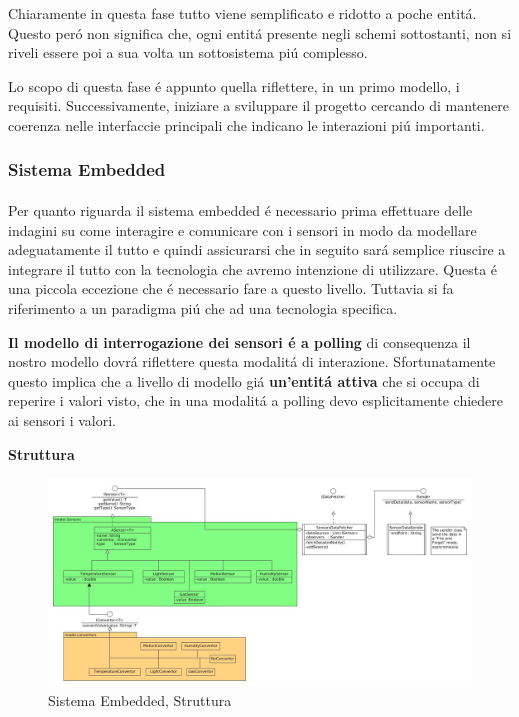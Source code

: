 Chiaramente in questa fase tutto viene semplificato e ridotto a poche entit\'a. Questo per\'o non significa che, ogni entit\'a presente negli schemi sottostanti, non si riveli essere poi a sua volta un sottosistema pi\'u complesso.

Lo scopo di questa fase \'e appunto quella riflettere, in un primo modello, i requisiti. Successivamente, iniziare a sviluppare il progetto cercando di mantenere coerenza nelle interfaccie principali che indicano le interazioni pi\'u importanti.

\newpage

\subsubsection{Sistema Embedded}

\paragraph{}Per quanto riguarda il sistema embedded \'e necessario prima effettuare delle indagini su come interagire e comunicare con i sensori in modo da modellare adeguatamente il tutto e quindi assicurarsi che in seguito sar\'a semplice riuscire a integrare il tutto con la tecnologia che avremo intenzione di utilizzare. Questa \'e una piccola eccezione che \'e necessario fare a questo livello. Tuttavia si fa riferimento a un paradigma pi\'u che ad una tecnologia specifica.

\textbf{Il modello di interrogazione dei sensori \'e a polling} di consequenza il nostro modello dovr\'a riflettere questa modalit\'a di interazione. Sfortunatamente questo implica che a livello di modello gi\'a \textbf{un'entit\'a attiva} che si occupa di reperire i valori visto, che in una modalit\'a a polling devo esplicitamente chiedere ai sensori i valori.

\begin{center}
 \textbf{Struttura}
\end{center}

\begin{figure}[h]
\centering
\includegraphics[width=\textwidth]{Figures/DomainModel/EmbeddedSystem/Structure}
\caption{Sistema Embedded, Struttura}
\end{figure}

